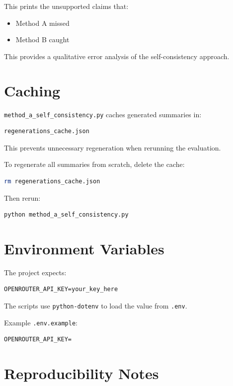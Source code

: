\documentclass[11pt,a4paper]{article}
\begin{document}
This prints the unsupported claims that:

\begin{itemize}
    \item Method A missed
    \item Method B caught
\end{itemize}

This provides a qualitative error analysis of the self-consistency approach.


\section{Caching}

\texttt{method\_a\_self\_consistency.py} caches generated summaries in:

\begin{lstlisting}
regenerations_cache.json
\end{lstlisting}

This prevents unnecessary regeneration when rerunning the evaluation.

To regenerate all summaries from scratch, delete the cache:

\begin{lstlisting}[language=bash]
rm regenerations_cache.json
\end{lstlisting}

Then rerun:

\begin{lstlisting}[language=bash]
python method_a_self_consistency.py
\end{lstlisting}


\section{Environment Variables}

The project expects:

\begin{lstlisting}
OPENROUTER_API_KEY=your_key_here
\end{lstlisting}

The scripts use \texttt{python-dotenv} to load the value from \texttt{.env}.

Example \texttt{.env.example}:

\begin{lstlisting}
OPENROUTER_API_KEY=
\end{lstlisting}


\section{Reproducibility Notes}
\end{document}
